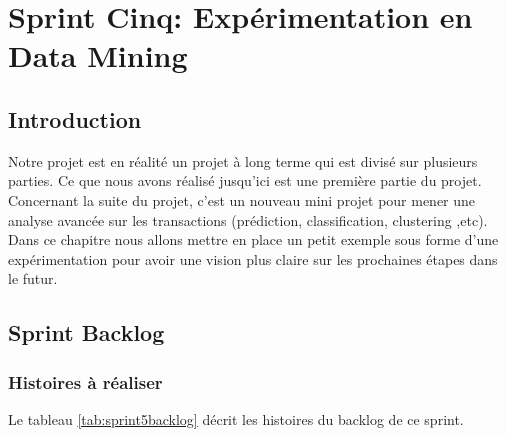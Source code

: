 \graphicspath{{./chapitres/chapitre7/figures/}}
\setcounter{mtc}{7}
\chapter{Sprint Cinq: Expérimentation en Data Mining}
\minitoc
\newpage
\section*{Introduction}
Notre projet est en réalité un projet à long terme qui est divisé sur plusieurs parties. Ce que nous avons réalisé jusqu'ici est une première partie du projet.\newline
Concernant la suite du projet, c'est un nouveau mini projet pour mener une analyse avancée sur les transactions (prédiction,  classification, clustering ,etc).\newline
Dans ce chapitre nous allons mettre en place un petit exemple sous forme d'une expérimentation pour avoir une vision plus claire sur les prochaines étapes dans le futur.
\section{Sprint Backlog}
\subsection{Histoires \`a r\'ealiser}
Le tableau \ref{tab:sprint5backlog} d\'ecrit les histoires du backlog de ce sprint.

